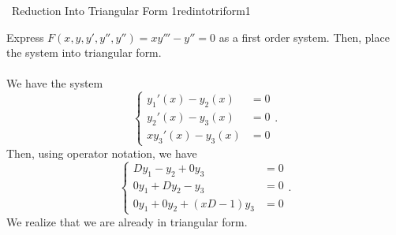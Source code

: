         \begin{example}{\Difficulty\,\Difficulty\,\,Reduction Into Triangular Form 1}{redintotriform1}

            Express \(F(x,y,y',y'',y'')=xy'''-y''=0\) as a first order system. Then, place the system into triangular form.
            \\
            \\
            We have the system
            \begin{equation*}
                \begin{cases}
                    y_1'(x)-y_2(x)&=0 \\
                    y_2'(x)-y_3(x)&=0 \\
                    xy_3'(x)-y_3(x)&=0
                \end{cases}.
            \end{equation*}
            Then, using operator notation, we have
            \begin{equation*}
                \begin{cases}
                    Dy_1-y_2+0y_3&=0 \\
                    0y_1+Dy_2-y_3&=0 \\
                    0y_1+0y_2+(xD-1)y_3&=0
                \end{cases}.
            \end{equation*}
            We realize that we are already in triangular form.
            
        \end{example}
        \pagebreak
